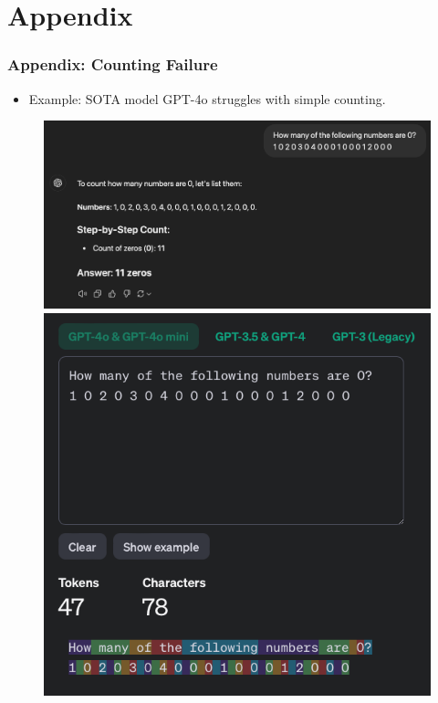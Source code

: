 \documentclass[14pt,aspectratio=169]{beamer}
\theoremstyle{remark}
\begin{document}

\section{Appendix}

\begin{frame}
    \frametitle{Appendix: Counting Failure}
    \begin{itemize}
        \item Example: SOTA model GPT-4o struggles with simple counting.
    \end{itemize}
    \begin{figure}
        \centering
        \begin{minipage}{0.55\textwidth}
            \centering
            \includegraphics[width=\textwidth]{fig/gpt4o_count_fail.png}
        \end{minipage}
        \begin{minipage}{0.35\textwidth}
            \centering
            \includegraphics[width=\textwidth]{fig/gpt4o_count_fail_tokens.png}
        \end{minipage}
    \end{figure}
\end{frame}
\end{document}

